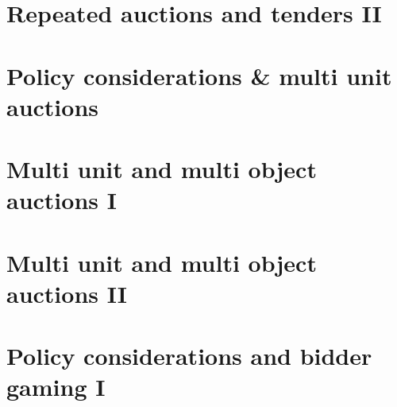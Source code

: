\documentclass{01_preamble/report}
\theoremstyle{definition}
\numberwithin{equation}{section}
\begin{document}
\section{Repeated auctions and tenders II}


\section{Policy considerations \& multi unit auctions}


\section{Multi unit and multi object auctions I}


\section{Multi unit and multi object auctions II}


\section{Policy considerations and bidder gaming I}


\newpage

\end{document}
